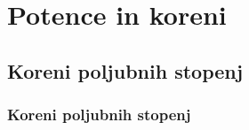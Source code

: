 \section{Potence in koreni}

\begin{frame}
    \sectionpage
\end{frame}

\begin{frame}
\end{frame}

    \subsection{Koreni poljubnih stopenj}

        \begin{frame}
            \frametitle{Koreni poljubnih stopenj}
        \end{frame}



